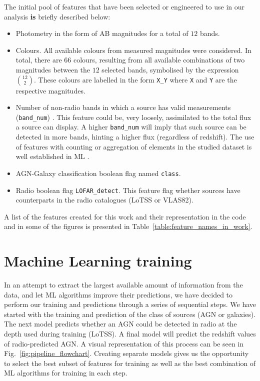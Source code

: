 \documentclass{aa}
\begin{document}
The initial pool of features that have been selected or engineered to use in our analysis \textbf{is} briefly described below:

\begin{itemize}
    \item Photometry in the form of AB magnitudes for a total of $12$ bands.
    
    \item Colours. All available colours from measured magnitudes were considered. In total, there are $66$ colours, resulting from all available combinations of two magnitudes between the $12$ selected bands, symbolised by the expression $\binom{12}{2}$. These colours are labelled in the form \verb|X_Y| where \verb|X| and \verb|Y| are the respective magnitudes.

    \item Number of non-radio bands in which a source has valid measurements (\verb|band_num|) . This feature could be, very loosely, assimilated to the total flux a source can display. A higher \verb|band_num| will imply that such source can be detected in more bands, hinting a higher flux (regardless of redshift). The use of features with counting or aggregation of elements in the studied dataset is well established in ML \citep[see, for example,][]{zheng2018feature, duboue2020art, 2021AJ....161..141S}.
    
    \item AGN-Galaxy classification boolean flag named \verb|class|.
    \item Radio boolean flag \verb|LOFAR_detect|. This feature flag whether sources have counterparts in the radio catalogues (LoTSS or VLAS82).
\end{itemize}

A list of the features created for this work and their representation in the code and in some of the figures is presented in Table~\ref{table:feature_names_in_work}.

\section{Machine Learning training}\label{sec:ML_training}

In an attempt to extract the largest available amount of information from the data, and let ML algorithms improve their predictions, we have decided to perform our training and predictions through a series of sequential steps. We have started with the training and prediction of the class of sources (AGN or galaxies). The next model predicts whether an AGN could be detected in radio at the depth used during training (LoTSS). A final model will predict the redshift values of radio-predicted AGN. A visual representation of this process can be seen in Fig.~\ref{fig:pipeline_flowchart}. Creating separate models gives us the opportunity to select the best subset of features for training as well as the best combination of ML algorithms for training in each step.
\end{document}
